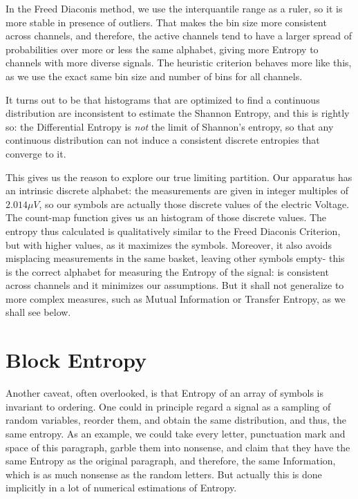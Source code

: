 \documentclass{article}
\begin{document}
In the Freed Diaconis method, we use the interquantile range as a ruler, so it is more stable in presence of outliers. That makes the bin size more consistent across channels, and therefore, the active channels tend to have a larger spread of probabilities over more or less the same alphabet, giving more Entropy to channels with more diverse signals. The heuristic criterion behaves more like this, as we use the exact same bin size and number of bins for all channels. 

It turns out to be that histograms that are optimized to find a continuous distribution are inconsistent to estimate the Shannon Entropy, and this is rightly so: the Differential Entropy is \emph{not} the limit of Shannon's entropy, so that any continuous distribution can not induce a consistent discrete entropies that converge to it. 

This gives us the reason to explore our true limiting partition. Our apparatus has an intrinsic discrete alphabet: the measurements are given in integer multiples of $2.014 \mu V$, so our symbols are actually those discrete values of the electric Voltage. The count-map function gives us an histogram of those discrete values. The entropy thus calculated is qualitatively similar to the Freed Diaconis Criterion, but with higher values, as it maximizes the symbols. Moreover, it also avoids misplacing measurements in the same basket, leaving other symbols empty- this is the correct alphabet for measuring the Entropy of
the signal: is consistent across channels and it minimizes our assumptions. But it shall
not generalize to more complex measures, such as Mutual Information or
Transfer Entropy, as we shall see below.


\section{Block Entropy}

Another caveat, often overlooked, is that Entropy of an array of symbols is invariant to ordering. One could in principle regard a signal as a sampling of random variables, reorder them, and obtain the same distribution, and thus, the same entropy. As an example, we could take every letter, punctuation mark and space of this paragraph, garble them into nonsense, and claim that they have the same Entropy as the original paragraph, and therefore, the same Information, which is as much nonsense as the random letters. But actually this is done implicitly in a lot of numerical estimations of Entropy.



{}

\end{document}
